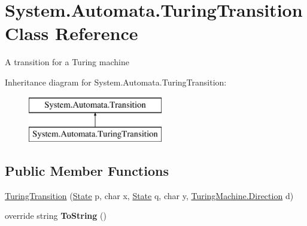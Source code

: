 \hypertarget{class_system_1_1_automata_1_1_turing_transition}{}\section{System.\+Automata.\+Turing\+Transition Class Reference}
\label{class_system_1_1_automata_1_1_turing_transition}


A transition for a Turing machine  


Inheritance diagram for System.\+Automata.\+Turing\+Transition\+:\begin{figure}[H]
\begin{center}
\leavevmode
\includegraphics[height=2.000000cm]{class_system_1_1_automata_1_1_turing_transition}
\end{center}
\end{figure}
\subsection*{Public Member Functions}
\begin{DoxyCompactItemize}
\item 
\mbox{\hyperlink{class_system_1_1_automata_1_1_turing_transition_a67564840226244a1f36666913d299469}{Turing\+Transition}} (\mbox{\hyperlink{class_system_1_1_automata_1_1_state}{State}} p, char x, \mbox{\hyperlink{class_system_1_1_automata_1_1_state}{State}} q, char y, \mbox{\hyperlink{class_system_1_1_automata_1_1_turing_machine_aa253c3820befa3cfdd3d17b2d8fdd2d9}{Turing\+Machine.\+Direction}} d)
\item 
\mbox{\label{class_system_1_1_automata_1_1_turing_transition_af59b7537f01077c715bc69eaa6b28544}} 
override string {\bfseries To\+String} ()
\end{DoxyCompactItemize}
